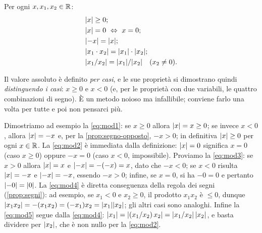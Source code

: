 \begin{proposizione}\label{prop:modulo-proprieta}
Per ogni $x,x_{1},x_{2}\in\mathbb{R}$:
\begin{align}
  &\lvert x\rvert\ge0; \label{eq:mod1}\\
  &\lvert x\rvert=0 \ \Leftrightarrow\ x=0; \label{eq:mod2}\\
  &\lvert -x\rvert=\lvert x\rvert; \label{eq:mod3}\\
  &\lvert x_{1}\cdot x_{2}\rvert=\lvert x_{1}\rvert\cdot\lvert x_{2}\rvert; \label{eq:mod4}\\
  &\lvert x_{1}/x_{2}\rvert=\lvert x_{1}\rvert/\lvert x_{2}\rvert \quad (x_{2}\neq0). \label{eq:mod5}
\end{align}
\end{proposizione}

\begin{schema}
\end{schema}

\begin{strategia}
Il valore assoluto è definito \emph{per casi}, e le sue proprietà si dimostrano quindi
\emph{distinguendo i casi}: $x\ge0$ e $x<0$ (e, per le proprietà con due variabili, le
quattro combinazioni di segno). È un metodo noioso ma infallibile; conviene farlo una
volta per tutte e poi non pensarci più.
\end{strategia}

\begin{dimostrazione}
Dimostriamo ad esempio la \eqref{eq:mod1}: se $x\ge0$ allora $\lvert x\rvert=x\ge0$; se invece
$x<0$, allora $\lvert x\rvert=-x$ e, per la \cref{prop:segno-opposto}, $-x>0$; in definitiva
$\lvert x\rvert\ge0$ per ogni $x\in\mathbb{R}$. La \eqref{eq:mod2} è immediata dalla definizione:
$\lvert x\rvert=0$ significa $x=0$ (caso $x\ge0$) oppure $-x=0$ (caso $x<0$, impossibile).
Proviamo la \eqref{eq:mod3}: se $x>0$ allora $\lvert x\rvert=x$ e $\lvert -x\rvert=-(-x)=x$, dato che
$-x<0$; se $x<0$ risulta $\lvert x\rvert=-x$ e $\lvert -x\rvert=-x$, essendo $-x>0$; infine, se $x=0$,
si ha $-0=0$ e pertanto $\lvert -0\rvert=\lvert 0\rvert$. La \eqref{eq:mod4} è diretta conseguenza
della regola dei segni (\cref{prop:segni}): ad esempio, se $x_{1}<0$ e $x_{2}\ge0$, il
prodotto $x_{1}x_{2}$ è $\le0$, dunque
$\lvert x_{1}x_{2}\rvert=-(x_{1}x_{2})=(-x_{1})x_{2}=\lvert x_{1}\rvert\lvert x_{2}\rvert$; gli altri casi
sono analoghi. Infine la \eqref{eq:mod5} segue dalla \eqref{eq:mod4}:
$\lvert x_{1}\rvert=\lvert (x_{1}/x_{2})\,x_{2}\rvert=\lvert x_{1}/x_{2}\rvert\,\lvert x_{2}\rvert$, e basta dividere
per $\lvert x_{2}\rvert$, che è non nullo per la \eqref{eq:mod2}.
\end{dimostrazione}


